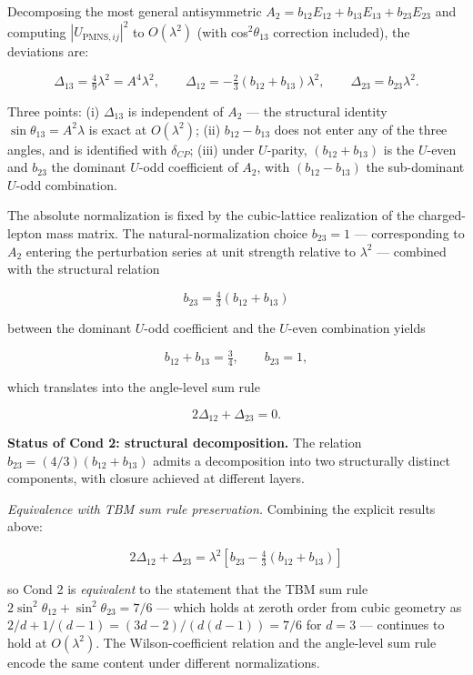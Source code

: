 \documentclass[
]{article}
\begin{document}
Decomposing the most general antisymmetric
\(A_2 = b_{12} E_{12} + b_{13} E_{13} + b_{23} E_{23}\) and computing
\(|U_{\text{PMNS},ij}|^2\) to \(O(\lambda^2)\) (with
cos\(^2\theta_{13}\) correction included), the deviations are:

\[\Delta_{13} = \tfrac{4}{9}\lambda^2 = A^4 \lambda^2, \qquad \Delta_{12} = -\tfrac{2}{3}(b_{12}+b_{13})\lambda^2, \qquad \Delta_{23} = b_{23}\lambda^2.\]

Three points: (i) \(\Delta_{13}\) is independent of \(A_2\) --- the
structural identity \(\sin\theta_{13} = A^2\lambda\) is exact at
\(O(\lambda^2)\); (ii) \(b_{12} - b_{13}\) does not enter any of the
three angles, and is identified with \(\delta_{CP}\); (iii) under
\(U\)-parity, \((b_{12}+b_{13})\) is the \(U\)-even and \(b_{23}\) the
dominant \(U\)-odd coefficient of \(A_2\), with \((b_{12}-b_{13})\) the
sub-dominant \(U\)-odd combination.

The absolute normalization is fixed by the cubic-lattice realization of
the charged-lepton mass matrix. The natural-normalization choice
\(b_{23} = 1\) --- corresponding to \(A_2\) entering the perturbation
series at unit strength relative to \(\lambda^2\) --- combined with the
structural relation

\[b_{23} = \tfrac{4}{3}(b_{12}+b_{13})\]

between the dominant \(U\)-odd coefficient and the \(U\)-even
combination yields

\[b_{12} + b_{13} = \tfrac{3}{4}, \qquad b_{23} = 1,\]

which translates into the angle-level sum rule

\[2\Delta_{12} + \Delta_{23} = 0.\]

\textbf{Status of Cond 2: structural decomposition.} The relation
\(b_{23} = (4/3)(b_{12}+b_{13})\) admits a decomposition into two
structurally distinct components, with closure achieved at different
layers.

\emph{Equivalence with TBM sum rule preservation.} Combining the
explicit results above:

\[2\Delta_{12} + \Delta_{23} = \lambda^2\left[b_{23} - \tfrac{4}{3}(b_{12}+b_{13})\right]\]

so Cond 2 is \emph{equivalent} to the statement that the TBM sum rule
\(2\sin^2\theta_{12} + \sin^2\theta_{23} = 7/6\) --- which holds at
zeroth order from cubic geometry as
\(2/d + 1/(d-1) = (3d-2)/(d(d-1)) = 7/6\) for \(d=3\) --- continues to
hold at \(O(\lambda^2)\). The Wilson-coefficient relation and the
angle-level sum rule encode the same content under different
normalizations.
\end{document}
